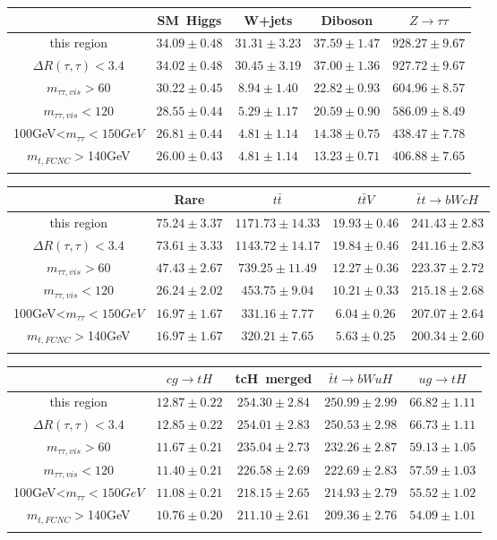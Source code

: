 \centering
\begin{tabular}{ccccc} \toprule\toprule
 & SM~Higgs & W+jets & Diboson & $Z\to \tau\tau$\\\midrule
 this region & $34.09\pm0.48$ & $31.31\pm3.23$ & $37.59\pm1.47$ & $928.27\pm9.67$\\
$\Delta R(\tau,\tau)<3.4$ & $34.02\pm0.48$ & $30.45\pm3.19$ & $37.00\pm1.36$ & $927.72\pm9.67$\\
$m_{\tau\tau,vis}>60$ & $30.22\pm0.45$ & $8.94\pm1.40$ & $22.82\pm0.93$ & $604.96\pm8.57$\\
$m_{\tau\tau,vis}<120$ & $28.55\pm0.44$ & $5.29\pm1.17$ & $20.59\pm0.90$ & $586.09\pm8.49$\\
100GeV<$m_{\tau\tau}<150GeV$ & $26.81\pm0.44$ & $4.81\pm1.14$ & $14.38\pm0.75$ & $438.47\pm7.78$\\
$m_{t,FCNC}>$140GeV & $26.00\pm0.43$ & $4.81\pm1.14$ & $13.23\pm0.71$ & $406.88\pm7.65$\\
\bottomrule\bottomrule\\
\end{tabular}
\begin{tabular}{ccccc} \toprule\toprule
 & Rare & $t\bar{t}$ & $t\bar{t}V$ & $\bar{t}t\to bWcH$\\\midrule
 this region & $75.24\pm3.37$ & $1171.73\pm14.33$ & $19.93\pm0.46$ & $241.43\pm2.83$\\
$\Delta R(\tau,\tau)<3.4$ & $73.61\pm3.33$ & $1143.72\pm14.17$ & $19.84\pm0.46$ & $241.16\pm2.83$\\
$m_{\tau\tau,vis}>60$ & $47.43\pm2.67$ & $739.25\pm11.49$ & $12.27\pm0.36$ & $223.37\pm2.72$\\
$m_{\tau\tau,vis}<120$ & $26.24\pm2.02$ & $453.75\pm9.04$ & $10.21\pm0.33$ & $215.18\pm2.68$\\
100GeV<$m_{\tau\tau}<150GeV$ & $16.97\pm1.67$ & $331.16\pm7.77$ & $6.04\pm0.26$ & $207.07\pm2.64$\\
$m_{t,FCNC}>$140GeV & $16.97\pm1.67$ & $320.21\pm7.65$ & $5.63\pm0.25$ & $200.34\pm2.60$\\
\bottomrule\bottomrule\\
\end{tabular}
\begin{tabular}{ccccc} \toprule\toprule
 & $cg\to tH$ & tcH~merged & $\bar{t}t\to bWuH$ & $ug\to tH$\\\midrule
 this region & $12.87\pm0.22$ & $254.30\pm2.84$ & $250.99\pm2.99$ & $66.82\pm1.11$\\
$\Delta R(\tau,\tau)<3.4$ & $12.85\pm0.22$ & $254.01\pm2.83$ & $250.53\pm2.98$ & $66.73\pm1.11$\\
$m_{\tau\tau,vis}>60$ & $11.67\pm0.21$ & $235.04\pm2.73$ & $232.26\pm2.87$ & $59.13\pm1.05$\\
$m_{\tau\tau,vis}<120$ & $11.40\pm0.21$ & $226.58\pm2.69$ & $222.69\pm2.83$ & $57.59\pm1.03$\\
100GeV<$m_{\tau\tau}<150GeV$ & $11.08\pm0.21$ & $218.15\pm2.65$ & $214.93\pm2.79$ & $55.52\pm1.02$\\
$m_{t,FCNC}>$140GeV & $10.76\pm0.20$ & $211.10\pm2.61$ & $209.36\pm2.76$ & $54.09\pm1.01$\\
\bottomrule\bottomrule\\
\end{tabular}
